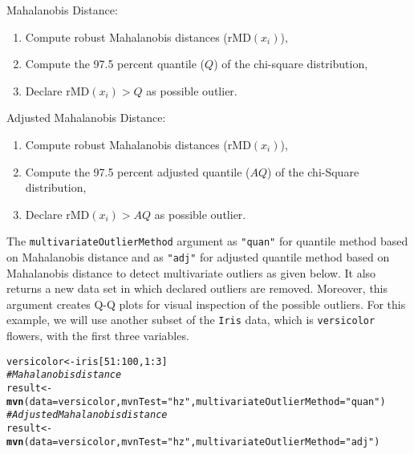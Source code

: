 \documentclass[11pt]{article}\usepackage[]{graphicx}\usepackage[]{color}
\makeatletter
\newcommand{\hlnum}[1]{\textcolor[rgb]{0.686,0.059,0.569}{#1}}%
\newcommand{\hlstr}[1]{\textcolor[rgb]{0.192,0.494,0.8}{#1}}%
\newcommand{\hlcom}[1]{\textcolor[rgb]{0.678,0.584,0.686}{\textit{#1}}}%
\newcommand{\hlopt}[1]{\textcolor[rgb]{0,0,0}{#1}}%
\newcommand{\hlstd}[1]{\textcolor[rgb]{0.345,0.345,0.345}{#1}}%
\newcommand{\hlkwb}[1]{\textcolor[rgb]{0.69,0.353,0.396}{#1}}%
\newcommand{\hlkwc}[1]{\textcolor[rgb]{0.333,0.667,0.333}{#1}}%
\newcommand{\hlkwd}[1]{\textcolor[rgb]{0.737,0.353,0.396}{\textbf{#1}}}%
\newenvironment{kframe}{%
 \def\at@end@of@kframe{}%
 \ifinner\ifhmode%
  \def\at@end@of@kframe{\end{minipage}}%
  \begin{minipage}{\columnwidth}%
 \fi\fi%
 \def\FrameCommand##1{\hskip\@totalleftmargin \hskip-\fboxsep
 \colorbox{shadecolor}{##1}\hskip-\fboxsep
     \hskip-\linewidth \hskip-\@totalleftmargin \hskip\columnwidth}%
 \MakeFramed {\advance\hsize-\width
   \@totalleftmargin\z@ \linewidth\hsize
   \@setminipage}}%
 {\par\unskip\endMakeFramed%
 \at@end@of@kframe}
\newenvironment{knitrout}{}{} %
\makeatother
\begin{document}
\noindent Mahalanobis Distance:
\begin{enumerate}
	\item {Compute robust Mahalanobis distances ($\mathrm{rMD}(x_i)$),}
	\item {Compute the 97.5 percent quantile ($Q$) of the chi-square distribution,}
	\item {Declare $\mathrm{rMD}(x_i) > Q$ as possible outlier.}
\end{enumerate}

\noindent Adjusted Mahalanobis Distance:
\begin{enumerate}
	\item {Compute robust Mahalanobis distances ($\mathrm{rMD}(x_i)$),}
	\item {Compute the 97.5 percent adjusted quantile ($AQ$) of the chi-Square distribution,}
	\item {Declare $\mathrm{rMD}(x_i) > AQ$ as possible outlier.}
\end{enumerate}

The \texttt{multivariateOutlierMethod} argument as \texttt{"quan"} for quantile method based on Mahalanobis distance and as \texttt{"adj"} for adjusted quantile method based on Mahalanobis distance to detect multivariate outliers as given below. It also returns a new data set in which declared outliers are removed. Moreover, this argument creates Q-Q plots for visual inspection of the possible outliers. For this example, we will use another subset of the \texttt{Iris} data, which is \texttt{versicolor} flowers, with the first three variables.

\begin{knitrout}
\color{fgcolor}\begin{kframe}
\begin{alltt}
\hlstd{versicolor} \hlkwb{<-} \hlstd{iris[}\hlnum{51}\hlopt{:}\hlnum{100}\hlstd{,} \hlnum{1}\hlopt{:}\hlnum{3}\hlstd{]}
\hlcom{# Mahalanobis distance}
\hlstd{result} \hlkwb{<-} \hlkwd{mvn}\hlstd{(}\hlkwc{data} \hlstd{= versicolor,} \hlkwc{mvnTest} \hlstd{=} \hlstr{"hz"}\hlstd{,} \hlkwc{multivariateOutlierMethod} \hlstd{=} \hlstr{"quan"}\hlstd{)}
\hlcom{# Adjusted Mahalanobis distance}
\hlstd{result} \hlkwb{<-} \hlkwd{mvn}\hlstd{(}\hlkwc{data} \hlstd{= versicolor,} \hlkwc{mvnTest} \hlstd{=} \hlstr{"hz"}\hlstd{,} \hlkwc{multivariateOutlierMethod} \hlstd{=} \hlstr{"adj"}\hlstd{)}
\end{alltt}
\end{kframe}
\end{knitrout}
\end{document}
